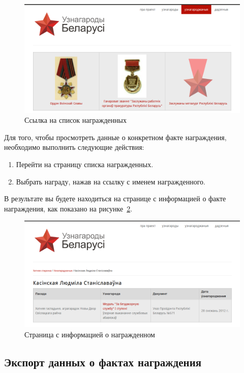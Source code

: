 \begin{figure}[h]
  \centering
  \includegraphics[width=160mm]{pic/help_awarded_link.png}
  \caption{Ссылка на список награжденных}
  \label{fig:awarded_link}
\end{figure}

Для того, чтобы просмотреть данные о конкретном факте награждения,
необходимо выполнить следующие действия:
\begin{enumerate}
\item Перейти на страницу списка награжденных.
\item Выбрать награду, нажав на ссылку с именем награжденного. 
\end{enumerate}

В результате вы будете находиться на странице с информацией о
факте награждения, как показано на рисунке~\ref{fig:awarded_info}.

\begin{figure}[h]
  \centering
  \includegraphics[width=160mm]{pic/help_awarded_info.png}
  \caption{Страница с информацией о награжденном}
  \label{fig:awarded_info}
\end{figure}

\subsection{Экспорт данных о фактах награждения}
\label{ssec:help_export_awarded}

